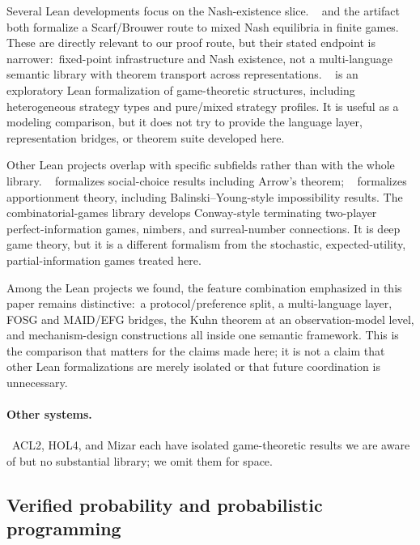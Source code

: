 Several Lean developments focus on the Nash-existence slice.
~\citep{MathXMUMBrouwer2026} and the
artifact~\citep{SoloAryGameTheoryFormalization2026} both formalize
a Scarf/Brouwer route to mixed Nash equilibria in finite games.
These are directly relevant to our  proof
route, but their stated endpoint is narrower:\ fixed-point
infrastructure and Nash existence, not a multi-language semantic
library with theorem transport across representations.
~\citep{MixedMatchedFormalizingGameTheory} is an exploratory Lean
formalization of game-theoretic structures, including heterogeneous
strategy types and pure/mixed strategy profiles.  It is useful as a
modeling comparison, but it does not try to provide the language
layer, representation bridges, or theorem suite developed here.

Other Lean projects overlap with specific subfields rather than with
the whole library.  
~\citep{LeanSocialChoice} formalizes social-choice results including
Arrow's theorem; ~\citep{Apportionmentlib2026}
formalizes apportionment theory, including Balinski--Young-style
impossibility results.  The combinatorial-games library
\citep{LeanCombinatorialGames} develops Conway-style terminating
two-player perfect-information games, nimbers, and surreal-number
connections.  It is deep game theory, but it is a different
formalism from the stochastic, expected-utility, partial-information
games treated here.

Among the Lean projects we found, the feature combination emphasized
in this paper remains distinctive:\ a protocol/preference split, a
multi-language layer, FOSG and MAID/EFG bridges, the Kuhn theorem at
an observation-model level, and mechanism-design constructions all
inside one semantic framework.  This is the comparison that matters
for the claims made here; it is not a claim that other Lean
formalizations are merely isolated or that future coordination is
unnecessary.

\paragraph{Other systems.}\ ACL2, HOL4, and Mizar each have
isolated game-theoretic results we are aware of but no substantial
library; we omit them for space.

\subsection{Verified probability and probabilistic programming}
\label{sec:rw:probability}

